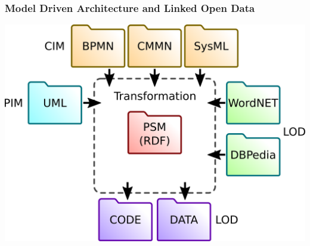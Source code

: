 \documentclass[10pt]{beamer}
\begin{document}
\begin{frame}
  \frametitle{Model Driven Architecture and Linked Open Data}
  \begin{center}
    \includegraphics[width=0.9\linewidth]{mda-overview.pdf}
  \end{center}
\end{frame}
\end{document}
